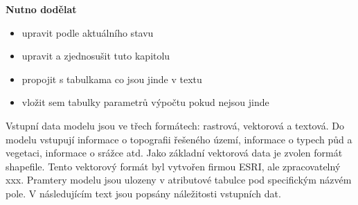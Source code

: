 
\textbf{Nutno dodělat}
\begin{itemize} \itemsep 0pt
\item upravit podle aktuálního stavu
\item upravit a zjednosušit tuto kapitolu
\item propojit s tabulkama co jsou jinde v textu
\item vložit sem tabulky parametrů výpočtu pokud nejsou jinde
\end{itemize}


Vstupní data modelu jsou ve třech formátech: rastrová, vektorová a textová. Do modelu vstupují informace o topografii řešeného území, informace o typech půd a vegetaci, informace o srážce atd. Jako základní vektorová data je zvolen formát shapefile. Tento vektorový formát byl vytvořen firmou ESRI, ale zpracovatelný xxx. Pramtery modelu jsou ulozeny v atributové tabulce pod specifickým názvém pole. 
V následujícím text jsou popsány náležitosti vstupních dat. 

